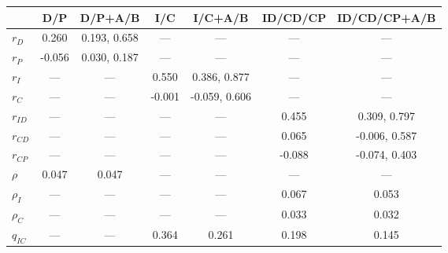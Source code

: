 \begin{supptable}
    \begin{center}
    
    \begin{tabular}{lcccccc}
                       & D/P   & D/P+A/B      & I/C    & I/C+A/B      & ID/CD/CP & ID/CD/CP+A/B \\ \midrule
        $r_D$          & 0.260 & 0.193, 0.658 & ---    & ---          & ---      & ---          \\
        $r_P$          &-0.056 & 0.030, 0.187 & ---    & ---          & ---      & ---          \\
        $r_I$          & ---   & ---          & 0.550  & 0.386, 0.877 & ---      & ---          \\
        $r_C$          & ---   & ---          &-0.001  &-0.059, 0.606 & ---      & ---          \\
        $r_{ID}$       & ---   & ---          & ---    & ---          & 0.455    & 0.309, 0.797 \\
        $r_{CD}$       & ---   & ---          & ---    & ---          & 0.065    &-0.006, 0.587 \\
        $r_{CP}$       & ---   & ---          & ---    & ---          &-0.088    &-0.074, 0.403 \\
        $\rho$         & 0.047 & 0.047        & ---    & ---          & ---      & ---          \\
        $\rho_I$       & ---   & ---          & ---    & ---          & 0.067    & 0.053        \\
        $\rho_C$       & ---   & ---          & ---    & ---          & 0.033    & 0.032        \\
        $q_{IC}$       & ---   & ---          & 0.364  & 0.261        & 0.198    & 0.145        
    \end{tabular}
    
    \vspace{12pt}
            

\end{center}
\end{supptable}
